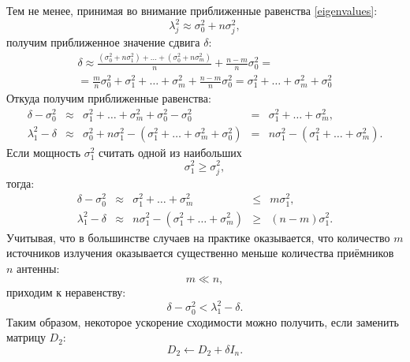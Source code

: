 \documentclass[a4paper,12pt]{article}
\begin{document}
    Тем не менее, принимая во внимание приближенные равенства \eqref{eigenvalues}:
    \[
        \lambda_j^2 \approx \sigma_0^2 + n \sigma_j^2 ,
    \]
    получим приближенное значение сдвига $\delta$:
    \begin{multline*}
        \delta
        \approx \frac{(\sigma_0^2 + n \sigma_1^2) + \dots + (\sigma_0^2 + n \sigma_m^2)}{n} + \frac{n-m}{n} \sigma_0^2 = \\
        = \frac{m}{n} \sigma_0^2 + \sigma_1^2 + \dots + \sigma_m^2 + \frac{n-m}{n} \sigma_0^2
        = \sigma_1^2 + \dots + \sigma_m^2 + \sigma_0^2
    \end{multline*}
    Откуда получим приближенные равенства:
    \[
        \begin{array}{lclcl}
            \delta - \sigma_0^2  & \approx & \sigma_1^2 + \dots + \sigma_m^2 + \sigma_0^2 - \sigma_0^2 & = & \sigma_1^2 + \dots + \sigma_m^2 , \\
            \lambda_1^2 - \delta & \approx & \sigma_0^2 + n \sigma_1^2 - ( \sigma_1^2 + \dots + \sigma_m^2 + \sigma_0^2 ) & = & n \sigma_1^2 - ( \sigma_1^2 + \dots + \sigma_m^2 ) .
        \end{array}
    \]
    Если мощность $\sigma_1^2$ считать одной из наибольших
    \[
        \sigma_1^2 \ge \sigma_j^2,
    \]
    тогда:
    \[
        \begin{array}{lclcl}
            \delta - \sigma_0^2  & \approx & \sigma_1^2 + \dots + \sigma_m^2 & \le & m \sigma_1^2, \\
            \lambda_1^2 - \delta & \approx & n \sigma_1^2 - ( \sigma_1^2 + \dots + \sigma_m^2 ) & \ge & (n - m) \sigma_1^2.
        \end{array}
    \]
    Учитывая, что в большинстве случаев на практике оказывается, что количество $m$ источников излучения оказывается существенно меньше количества приёмников $n$ антенны:
    \[
        m \ll n ,
    \]
    приходим к неравенству:
    \[
        \delta - \sigma_0^2 < \lambda_1^2 - \delta .
    \]
    Таким образом, некоторое ускорение сходимости можно получить, если заменить матрицу $D_2$:
    \[
        D_2 \leftarrow D_2 + \delta I_n.
    \]
\end{document}
